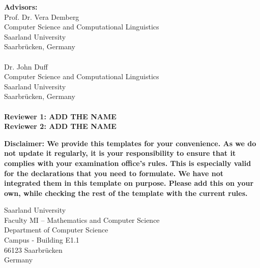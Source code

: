 \pagestyle{empty}

\vspace*{0.5cm}
\textbf{Advisors:}\\
Prof. Dr. Vera Demberg\\
Computer Science and Computational Linguistics\\
Saarland University\\
Saarbrücken, Germany\\\\

Dr. John Duff\\
Computer Science and Computational Linguistics\\
Saarland University\\
Saarbrücken, Germany\\\\


\vspace*{2.5cm}
\textbf{\color{red}  Reviewer 1: ADD THE NAME}\\
\textbf{\color{red}  Reviewer 2: ADD THE NAME}\\


\vspace{4.5cm}

\textbf{\color{red}  Disclaimer: We provide this templates for your convenience. As we do not update it regularly, it is your responsibility to ensure that it complies with your examination office's rules. This is especially valid for the declarations that you need to formulate. We have not integrated them in this template on purpose. Please add this on your own, while checking the rest of the template with the current rules.}


\vspace{3cm}
Saarland University\\
Faculty MI – Mathematics and Computer Science\\
Department of Computer Science\\
Campus - Building E1.1\\
66123 Saarbrücken\\
Germany\\


